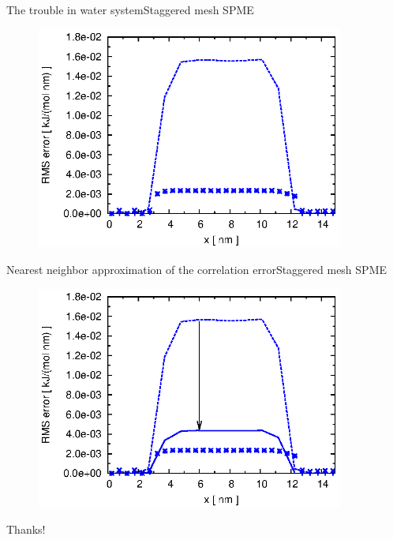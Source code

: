 \documentclass{beamer}
\begin{document}
\begin{frame}{The trouble in water system}{Staggered mesh SPME}
  \begin{figure}
    \centering
    \includegraphics[width=0.9\textwidth]{figs/long-range-inhomo/water-st-error-1.eps}
  \end{figure}  
\end{frame}

\begin{frame}{Nearest neighbor approximation of the correlation error}{Staggered mesh SPME}
  \begin{figure}
    \centering
    \includegraphics[width=0.9\textwidth]{figs/long-range-inhomo/water-st-error-2.eps}
  \end{figure}  
\end{frame}


\begin{frame}
  \vfill
  \centerline{ \Huge
    Thanks!  }
  \vfill
\end{frame}
\end{document}

